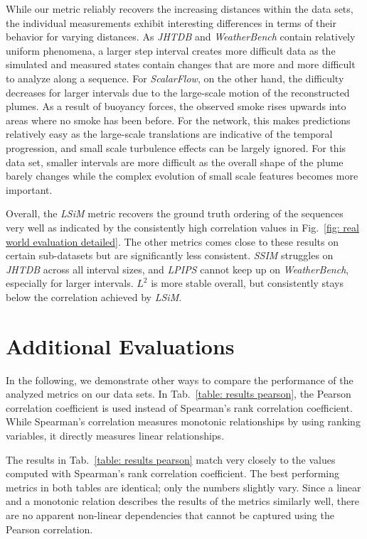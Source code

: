 While our metric reliably recovers the increasing distances within the data sets, the individual measurements exhibit interesting differences in terms of their behavior for varying distances. As \textit{JHTDB} and \textit{WeatherBench} contain relatively uniform phenomena, a larger step interval creates more difficult data as the simulated and measured states contain changes that are more and more difficult to analyze along a sequence.
For \textit{ScalarFlow}, on the other hand, the difficulty decreases for larger intervals due to the large-scale motion of the reconstructed plumes. As a result of buoyancy forces, the observed smoke rises upwards into areas where no smoke has been before. For the network, this makes predictions relatively easy as the large-scale translations are indicative of the temporal progression, and small scale turbulence effects can be largely ignored. For this data set, smaller intervals are more difficult as the overall shape of the plume barely changes while the complex evolution of small scale features becomes more important.

Overall, the \textit{LSiM} metric recovers the ground truth ordering of the sequences very well as indicated by the consistently high correlation values in Fig.~\ref{fig: real world evaluation detailed}. The other metrics comes close to these results on certain sub-datasets but are significantly less consistent. \textit{SSIM} struggles on \textit{JHTDB} across all interval sizes, and \textit{LPIPS} cannot keep up on \textit{WeatherBench}, especially for larger intervals. $L^2$ is more stable overall, but consistently stays below the correlation achieved by \textit{LSiM}.


\section{Additional Evaluations} \label{append: additional evaluations}
In the following, we demonstrate other ways to compare the performance of the analyzed metrics on our data sets. In Tab.~\ref{table: results pearson}, the Pearson correlation coefficient is used instead of Spearman's rank correlation coefficient. While Spearman's correlation measures monotonic relationships by using ranking variables, it directly measures linear relationships.

The results in Tab.~\ref{table: results pearson} match very closely to the values computed with Spearman's rank correlation coefficient. The best performing metrics in both tables are identical; only the numbers slightly vary. Since a linear and a monotonic relation describes the results of the metrics similarly well, there are no apparent non-linear dependencies that cannot be captured using the Pearson correlation.


